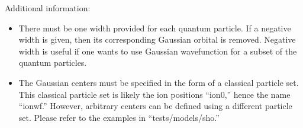 \documentclass[letterpaper,10pt,english]{sphinxmanual}
\begin{document}
Additional information:
\begin{itemize}
\item {} 
 There must be one width provided for each quantum particle.
If a negative width is given, then its corresponding Gaussian orbital
is removed. Negative width is useful if one wants to use Gaussian
wavefunction for a subset of the quantum particles.

\item {} 
 The Gaussian centers must be specified in the form of a
classical particle set. This classical particle set is likely the ion
positions “ion0,” hence the name “ionwf.” However, arbitrary centers
can be defined using a different particle set. Please refer to the
examples in “tests/models/sho.”

\end{itemize}
\end{document}
